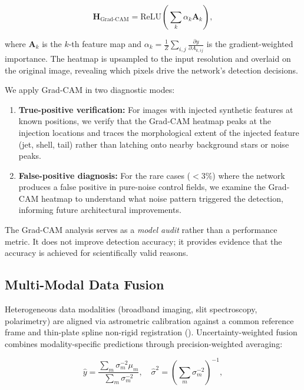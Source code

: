 \documentclass[preprint2]{aastex631}
\begin{document}
\begin{equation}\label{eq:gradcam}
\mathbf{H}_{\text{Grad-CAM}} = \text{ReLU}\left(\sum_k \alpha_k \mathbf{A}_k\right),
\end{equation}

where $\mathbf{A}_k$ is the $k$-th feature map and $\alpha_k = \frac{1}{Z}\sum_{i,j}\frac{\partial y}{\partial A_{k,ij}}$ is the gradient-weighted importance. The heatmap is upsampled to the input resolution and overlaid on the original image, revealing which pixels drive the network's detection decisions.

We apply Grad-CAM in two diagnostic modes:

\begin{enumerate}
    \item \textbf{True-positive verification:} For images with injected synthetic features at known positions, we verify that the Grad-CAM heatmap peaks at the injection locations and traces the morphological extent of the injected feature (jet, shell, tail) rather than latching onto nearby background stars or noise peaks.
    \item \textbf{False-positive diagnosis:} For the rare cases ($<3\%$) where the network produces a false positive in pure-noise control fields, we examine the Grad-CAM heatmap to understand what noise pattern triggered the detection, informing future architectural improvements.
\end{enumerate}

The Grad-CAM analysis serves as a \textit{model audit} rather than a performance metric. It does not improve detection accuracy; it provides evidence that the accuracy is achieved for scientifically valid reasons.

\subsection{Multi-Modal Data Fusion}

Heterogeneous data modalities (broadband imaging, slit spectroscopy, polarimetry) are aligned via astrometric calibration against a common reference frame and thin-plate spline non-rigid registration (\citealt{bertin06}). Uncertainty-weighted fusion combines modality-specific predictions through precision-weighted averaging:

\begin{equation}\label{eq:uncertainty_fusion}
\hat{y} = \frac{\sum_m \sigma_m^{-2} \mu_m}{\sum_m \sigma_m^{-2}}, \quad \hat{\sigma}^2 = \left(\sum_m \sigma_m^{-2}\right)^{-1},
\end{equation}
\end{document}
